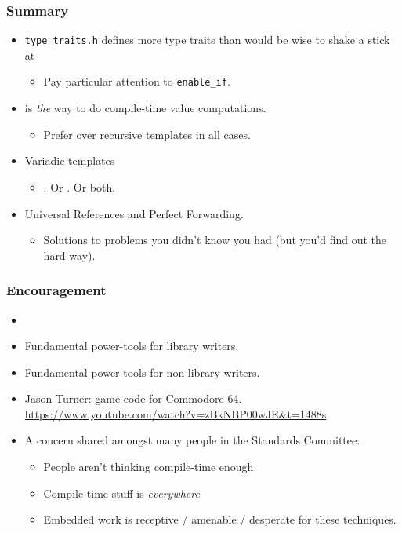 \begin{frame}[fragile,t]
\frametitle{Summary}
\begin{itemize}[<+->]
\item \texttt{type\_traits.h} defines more type traits than would be
  wise to shake a stick at
\begin{itemize}
  \item Pay particular attention to \texttt{enable\_if}.
\end{itemize}
\item \cexpr is \emph{the} way to do compile-time value computations.
\begin{itemize}
  \item Prefer over recursive templates in all cases.
\end{itemize}
\item Variadic templates
\begin{itemize}
  \item {}.  Or .  Or both.
\end{itemize}
\item Universal References and Perfect Forwarding.
\begin{itemize}
  \item Solutions to problems you didn't know you had (but you'd find
    out the hard way).
\end{itemize}
\end{itemize}
\end{frame}

\begin{frame}[fragile,t]
\frametitle{Encouragement}
\begin{itemize}[<+->]
\item {}
\item Fundamental power-tools for library writers.
\item Fundamental power-tools for non-library writers.
\item Jason Turner:  game code for Commodore
  64. \url{https://www.youtube.com/watch?v=zBkNBP00wJE&t=1488s}
\vskip 6pt
\item A concern shared amongst many people in the Standards Committee:
\begin{itemize}
  \item People aren't thinking compile-time enough.
  \item Compile-time stuff is \emph{everywhere}
  \item Embedded work is  receptive / amenable /
    desperate for these techniques.
\end{itemize}
\end{itemize}
\pause
\vskip 24pt
\begin{center}
\end{center}
\end{frame}


